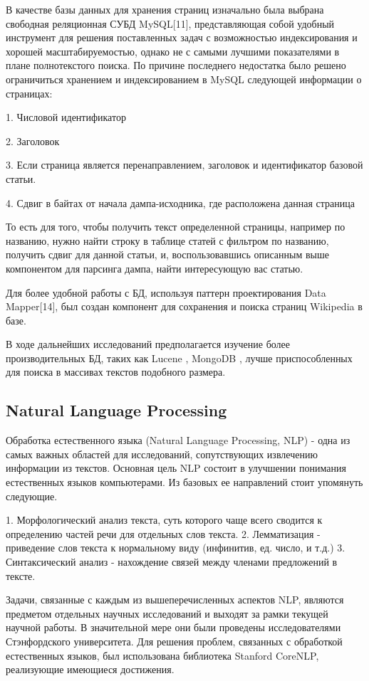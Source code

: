 В качестве базы данных для хранения страниц изначально была выбрана свободная реляционная 
СУБД MySQL[11], представляющая собой удобный инструмент для решения поставленных 
задач с возможностью индексирования и хорошей масштабируемостью, однако не с самыми
лучшими показателями в плане полнотекстого поиска. По причине последнего недостатка было 
решено ограничиться хранением и индексированием в MySQL следующей информации о страницах:

1. Числовой идентификатор

2. Заголовок

3. Если страница является перенаправлением, заголовок и идентификатор  базовой статьи.

4. Сдвиг в байтах от начала дампа-исходника, где расположена данная страница

То есть для того, чтобы получить текст определенной страницы, например по названию,
нужно найти строку в таблице статей с фильтром по названию,
получить сдвиг для данной статьи, и, воспользовавшись
описанным выше компонентом для парсинга дампа, найти интересующую вас статью.

Для более удобной работы с БД, используя паттерн проектирования Data Mapper[14], 
был создан компонент для сохранения и поиска страниц Wikipedia в базе.

В ходе дальнейших исследований предполагается изучение более производительных БД, таких
как Lucene \cite{lucene}, MongoDB \cite{mongoDB}, лучше приспособленных для поиска в
массивах текстов подобного размера.

\subsection{Natural Language Processing}

Обработка естественного языка (Natural Language Processing, NLP)\cite{textminingsurvey} - одна из самых 
важных областей для исследований, сопутствующих извлечению информации из текстов.
Основная цель NLP состоит в улучшении понимания естественных языков компьютерами.
Из базовых ее направлений стоит упомянуть следующие.

1. Морфологический анализ текста, суть которого чаще всего сводится к определению
частей речи для отдельных слов текста.
2. Лемматизация - приведение слов текста к нормальному виду (инфинитив, ед. число, и т.д.)
3. Синтаксический анализ - нахождение связей между членами предложений в тексте.

Задачи, связанные с каждым из вышеперечисленных аспектов NLP, 
являются предметом отдельных научных исследований и выходят за рамки текущей научной работы.
В значительной мере они были проведены исследователями Стэнфордского университета. 
Для решения проблем, связанных с обработкой естественных языков, был использована библиотека  Stanford CoreNLP,
реализующие имеющиеся достижения.

